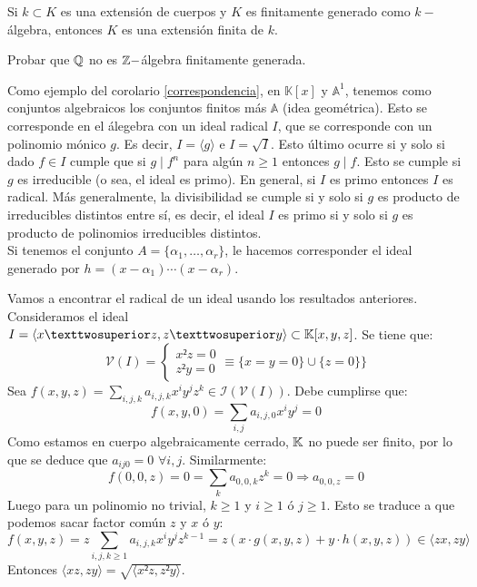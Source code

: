 \documentclass[ACGA.tex]{subfiles}
\begin{document}
\begin{prop}
Si $k\subset K$ es una extensión de cuerpos y $K$ es finitamente generado como $k-$álgebra, entonces $K$ es una extensión finita de $k$. 
\end{prop}

\begin{ejer}
Probar que $\mathbb{Q}$ no es $\mathbb{Z}-$álgebra finitamente generada. 
\end{ejer}

\begin{ej}
Como ejemplo del corolario \ref{correspondencia}, en $\mathbb{K}[x]$ y $\mathbb{A}^1$, tenemos como conjuntos algebraicos los conjuntos finitos más $\mathbb{A}$ (idea geométrica). Esto se corresponde en el álegebra con un ideal radical $I$, que se corresponde con un polinomio mónico $g$. Es decir, $I=\langle g\rangle$ e $I=\sqrt{I}$. Esto último ocurre si y solo si dado $f\in I$ cumple que  si $g\mid f^n$ para algún $n\geq 1$ entonces $g\mid f$. Esto se cumple si $g$ es irreducible (o sea, el ideal es primo). En general, si $I$ es primo entonces $I$ es radical. Más generalmente, la divisibilidad se cumple si y solo si $g$ es producto de irreducibles distintos entre sí, es decir, el ideal $I$ es primo si y solo si $g$ es producto de polinomios irreducibles distintos.\\
Si tenemos el conjunto $A=\{\alpha_1,\dots, \alpha_r\}$, le hacemos corresponder el ideal generado por $h=(x-\alpha_1)\cdots(x-\alpha_r)$. 
\end{ej}

\begin{ej} Vamos a encontrar el radical de un ideal usando los resultados anteriores. Consideramos el ideal $I = \langle x²z,z²y\rangle \subset \K[x,y,z]$. Se tiene que:
\[ \mathcal{V}(I) = \begin{cases}
	x²z = 0\\
	z²y = 0
\end{cases} \equiv \{x=y=0\}\cup\{ z=0\} \}\]
Sea $f(x,y,z) = \sum_{i,j,k}a_{i,j,k}x^iy^jz^k \in \mathcal{I}(\mathcal{V}(I))$. Debe cumplirse que:
\[ f(x,y,0) = \sum_{i,j}a_{i,j,0}x^iy^j = 0 \]
Como estamos en cuerpo algebraicamente cerrado, $\mathbb{K}$ no puede ser finito, por lo que se deduce que $a_{ij0}=0$ $\forall i,j$.
Similarmente:
\[ f(0,0,z) = 0 = \sum_{k}a_{0,0,k}z^k = 0 \Rightarrow a_{0,0,z} = 0 \]
Luego para un polinomio no trivial, $k ≥ 1$ y $i ≥ 1$ ó $j ≥ 1$. Esto se traduce a que podemos sacar factor común $z$ y $x$ ó $y$:
\[ f(x,y,z) = z \sum_{i,j,k ≥ 1} a_{i,j,k} x^iy^jz^{k-1} = z(x\cdot g(x,y,z)+y\cdot h(x,y,z)) \in \langle zx,zy \rangle \]
Entonces $\langle xz,zy\rangle = \sqrt{\langle x²z,z²y\rangle}$.
\end{ej}
\end{document}
